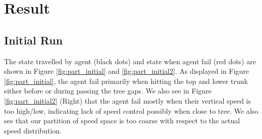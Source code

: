 \documentclass[11pt]{article}
\theoremstyle{definition}
\begin{document}
\section{\textbf{Result}}
\subsection{\textbf{Initial Run}}
The state travelled by agent (black dots) and state when agent fail (red dots) are shown in Figure \ref{fig:part_initial} and \ref{fig:part_initial2}. As displayed in Figure \ref{fig:part_initial}, the agent fail primarily when hitting the top and lower trunk either before or during passing the tree gaps. We also see in Figure \ref{fig:part_initial2}  (Right) that the agent fail mostly when their vertical speed is too high/low, indicating lack of speed control possibly when close to tree. We also see that our partition of speed space is too coarse with respect to the actual speed distribution.
\end{document}
